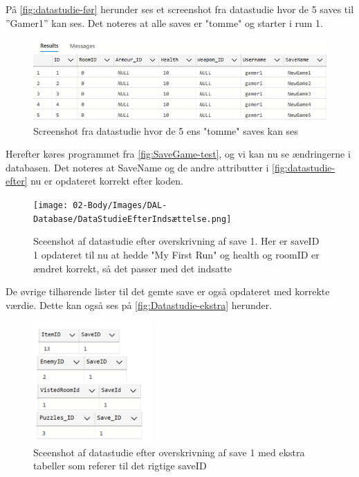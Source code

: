 På \autoref{fig:datastudie-før} herunder ses et screenshot fra datastudie hvor de 5 saves til ”Gamer1” kan ses.
Det noteres at alle saves er "tomme" og starter i rum 1.

\begin{figure}[H]
\centering
\includegraphics[width = \textwidth]{02-Body/Images/DAL-Database/DatastudieFørIndsættelse.png}
\caption{Screenshot fra datastudie hvor de 5 ens "tomme" saves kan ses}
\label{fig:datastudie-før}
\end{figure}

Herefter køres programmet fra \autoref{fig:SaveGame-test}, og vi kan nu se ændringerne i databasen.
Det noteres at SaveName og de andre attributter i \autoref{fig:datastudie-efter} nu er opdateret korrekt efter koden.

\begin{figure}[H]
\centering
\texttt{[image: 02-Body/Images/DAL-Database/DataStudieEfterIndsættelse.png]}
\caption{Sceenshot af datastudie efter overskrivning af save 1. Her er saveID 1 opdateret til nu at hedde "My First Run" og health og roomID er ændret korrekt, så det passer med det indsatte}
\label{fig:datastudie-efter}
\end{figure}

De øvrige tilhørende lister til det gemte save er også opdateret med korrekte værdie. Dette kan også ses på \autoref{fig:Datastudie-ekstra} herunder.

\begin{figure}[H]
\centering
\includegraphics[width = 0.4\textwidth]{02-Body/Images/DAL-Database/Lister.png}
\caption{Sceenshot af datastudie efter overskrivning af save 1 med ekstra tabeller som referer til det rigtige saveID}
\label{fig:Datastudie-ekstra}
\end{figure}

